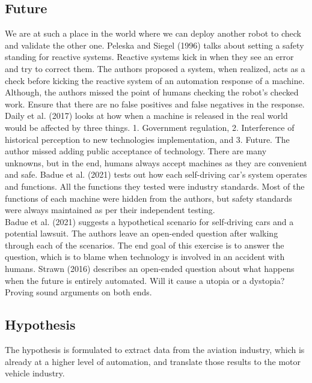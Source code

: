 \documentclass[
  man,floatsintext]{apa7}
\begin{document}
\hypertarget{future}{%
\subsection{Future}\label{future}}

We are at such a place in the world where we can deploy another robot to check and validate the other one. Peleska and Siegel (1996) talks about setting a safety standing for reactive systems. Reactive systems kick in when they see an error and try to correct them. The authors proposed a system, when realized, acts as a check before kicking the reactive system of an automation response of a machine. Although, the authors missed the point of humans checking the robot's checked work. Ensure that there are no false positives and false negatives in the response. Daily et al. (2017) looks at how when a machine is released in the real world would be affected by three things. 1. Government regulation, 2. Interference of historical perception to new technologies implementation, and 3. Future. The author missed adding public acceptance of technology. There are many unknowns, but in the end, humans always accept machines as they are convenient and safe. Badue et al. (2021) tests out how each self-driving car's system operates and functions. All the functions they tested were industry standards. Most of the functions of each machine were hidden from the authors, but safety standards were always maintained as per their independent testing.\\

Badue et al. (2021) suggests a hypothetical scenario for self-driving cars and a potential lawsuit. The authors leave an open-ended question after walking through each of the scenarios. The end goal of this exercise is to answer the question, which is to blame when technology is involved in an accident with humans. Strawn (2016) describes an open-ended question about what happens when the future is entirely automated. Will it cause a utopia or a dystopia? Proving sound arguments on both ends.\\

\hypertarget{hypothesis}{%
\subsection{Hypothesis}\label{hypothesis}}

The hypothesis is formulated to extract data from the aviation industry, which is already at a higher level of automation, and translate those results to the motor vehicle industry.
\end{document}
